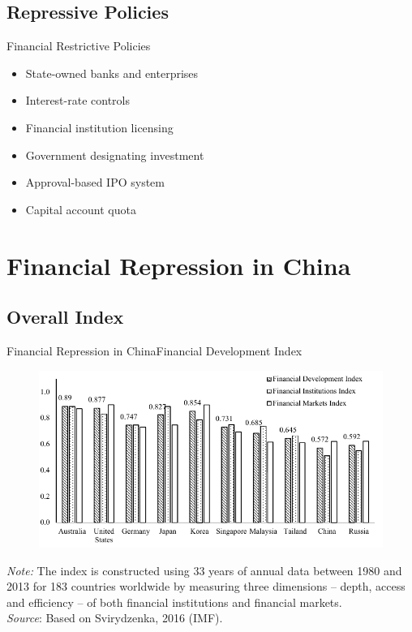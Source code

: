 \documentclass{beamer}
\begin{document}
\subsection{Repressive Policies}
\begin{frame}{Financial Restrictive Policies}
\begin{itemize}
\item State-owned banks and enterprises
\item Interest-rate controls
\item Financial institution licensing
\item Government designating investment
\item Approval-based IPO system
\item Capital account quota
\end{itemize}    
\end{frame}

\section{Financial Repression in China}
\subsection{Overall Index}
\begin{frame}{Financial Repression in China}{Financial Development Index}
\begin{figure}
\includegraphics[scale=.75]{fig/findev.pdf}
\end{figure}
\tiny
\emph{Note: }
The index is constructed using 33 years of annual data between 1980 and 2013 for
183 countries worldwide by measuring three dimensions -- depth, access and 
efficiency -- of both financial institutions and financial markets.\\
\emph{Source}: 
Based on Svirydzenka, 2016 (IMF).
\end{frame}
\end{document}
